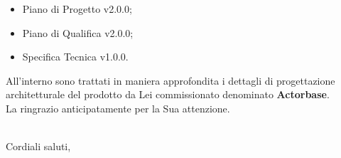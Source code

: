 \documentclass[10pt,a4paper]{letter} %
\begin{document}
\begin{letter}{}
\begin{itemize}
\begin{itemize}
    \item Piano di Progetto v2.0.0;
    \item Piano di Qualifica v2.0.0;
    \item Specifica Tecnica v1.0.0.
    \end{itemize}
  \end{itemize}
  All'interno sono trattati in maniera approfondita i dettagli di progettazione architetturale del prodotto
  da Lei commissionato denominato \textbf{Actorbase}.\\
  La ringrazio anticipatamente per la Sua attenzione. \\ \\
  \closing{Cordiali saluti,}

\end{letter}
\end{document}

